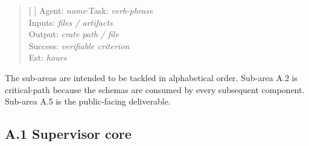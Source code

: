 \documentclass[12pt]{article}
\theoremstyle{definition}
\theoremstyle{remark}
\begin{document}
\begin{quote}\ttfamily\small
[ ] Agent: \textit{name}\quad$\cdot$\quad Task: \textit{verb-phrase}\\
\hspace*{1.5em}Inputs: \textit{files / artifacts}\\
\hspace*{1.5em}Output: \textit{crate path / file}\\
\hspace*{1.5em}Success: \textit{verifiable criterion}\\
\hspace*{1.5em}Est: \textit{hours}
\end{quote}

The sub-areas are intended to be tackled in alphabetical order.
Sub-area A.2 is critical-path because the schemas are consumed by
every subsequent component. Sub-area A.5 is the public-facing
deliverable.

\subsection*{A.1 Supervisor core}
\end{document}
